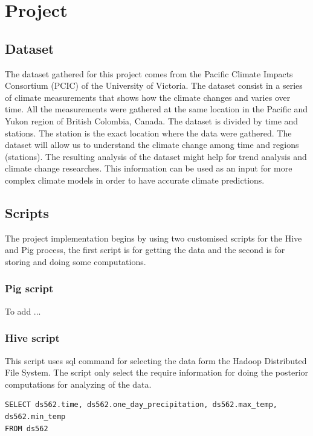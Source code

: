
\section{Project}
\label{sec:Project}




\subsection{ Dataset}
The dataset gathered for this project comes from the Pacific Climate Impacts Consortium (PCIC) of the University of Victoria. The dataset consist in a series of climate measurements that shows how the climate changes and varies over time. All the measurements were gathered at the same location in the Pacific and Yukon region of British Colombia, Canada.
The dataset is divided by time and stations. The station is the exact location where the data were gathered. 
The dataset will allow us to understand the climate change among time and regions (stations). The resulting analysis of the dataset might help for trend analysis and climate change researches. This information can be used as an input for more complex climate models in order to have accurate climate predictions.

\subsection{Scripts}
The project implementation begins by using two customised scripts for the Hive and Pig process, the first script is for getting the data and the second is for storing and doing some computations. 
\subsubsection*{Pig script} To add ...
\subsubsection*{Hive script}
This script uses sql command for selecting the data form the Hadoop Distributed File System. The script only select the require information for doing the posterior computations for analyzing of the data. 
\begin{lstlisting}
SELECT ds562.time, ds562.one_day_precipitation, ds562.max_temp, ds562.min_temp 
FROM ds562
\end{lstlisting}

